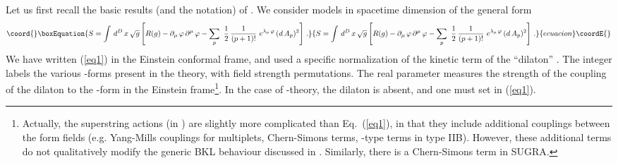 \documentclass[a4paper,12pt]{article}
\begin{document}
Let us first recall the basic results (and the notation) of 
\cite{dh1}. We consider models in spacetime dimension \coordHE{} of the 
general form
\begin{equation}\coord{}\boxEquation{
S = \int \, d^D \, x \, \sqrt{g} \left[ R(g) - \partial_{\mu} \, 
\varphi \, \partial^{\mu} \, \varphi - \sum_p \ \frac{1}{2} \, 
\frac{1}{(p+1)!} \ e^{\lambda_p \, \varphi} \, (d \, A_p)^2 \right] 
\, . \label{eq1}
}{
S = \int \, d^D \, x \, \sqrt{g} \left[ R(g) - \partial_{\mu} \, 
\varphi \, \partial^{\mu} \, \varphi - \sum_p \ \frac{1}{2} \, 
\frac{1}{(p+1)!} \ e^{\lambda_p \, \varphi} \, (d \, A_p)^2 \right] 
\, . }{ecuacion}\coordE{}\end{equation}
We have written (\ref{eq1}) in the Einstein conformal frame, and used a 
specific normalization of the kinetic term of the ``dilaton'' 
\myHighlight{$\varphi$}\coordHE{}. The integer \coordHE{} labels the various \coordHE{}-forms \coordHE{} present in the theory, with field 
strength \coordHE{} permutations. The real parameter \coordHE{} 
measures the strength of the coupling of the dilaton to the \coordHE{}-form 
\coordHE{} in the Einstein frame\footnote{Actually, the superstring actions (in 
\coordHE{}) are slightly more complicated than Eq.~(\ref{eq1}), in that 
they include additional couplings between the form fields (e.g. 
Yang-Mills couplings for \coordHE{} multiplets, Chern-Simons terms, \coordHE{}-type terms in type IIB). However, these 
additional terms do not qualitatively modify the generic BKL 
behaviour discussed in \cite{dh1}. Similarly, there is a Chern-Simons
term in \coordHE{} SUGRA.}. In the 
case of \coordHE{}-theory, the dilaton is 
absent, and one must set \coordHE{} in
(\ref{eq1}).
\end{document}
